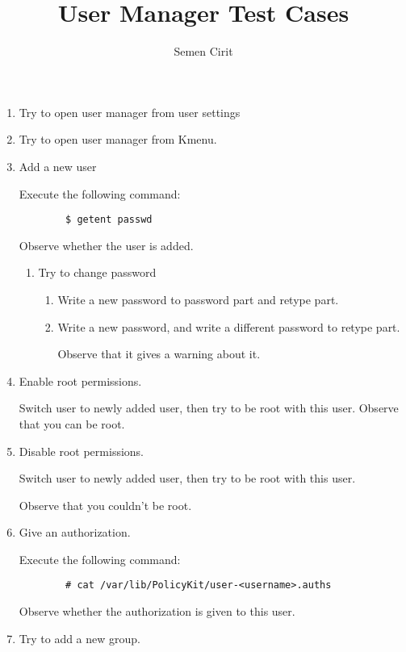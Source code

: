 \documentclass[a4paper,10pt]{article}
\title{User Manager Test Cases}
\author{Semen Cirit}
\begin{document}
\maketitle
\begin{enumerate}

\item Try to open user manager from user settings

\item Try to open user manager from Kmenu.

\item Add a new user

    Execute the following command:
    \begin{verbatim}
        $ getent passwd 
    \end{verbatim}
    Observe whether the user is added.

    \begin{enumerate}
    \item Try to change password
        \begin{enumerate}
        \item Write a new password to password part and retype part.
        \item Write a new password, and write a different password to retype part.

                Observe that it gives a warning about it.
        \end{enumerate}
    \end{enumerate}

    \item Enable root permissions.

          Switch user to newly added user, then try to be root with this user.
        Observe that you can be root.
    \item Disable root permissions.

        Switch user to newly added user, then try to be root with this user.
    
        Observe that you couldn't be root.

    \item Give an authorization.

        Execute the following command:
    \begin{verbatim}
        # cat /var/lib/PolicyKit/user-<username>.auths
    \end{verbatim}
        Observe whether the authorization is given to this user.

    
\item Try to add a new group.


\end{enumerate}
\end{document}
